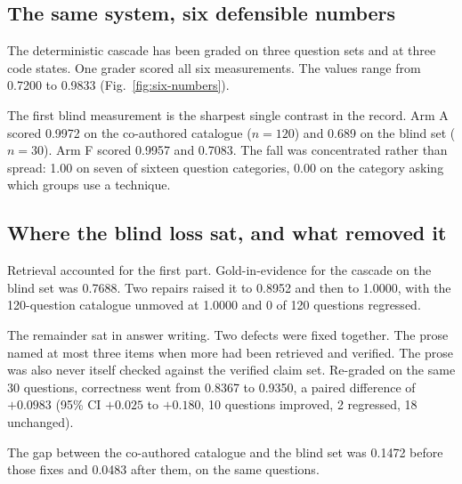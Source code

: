 \subsection{The same system, six defensible numbers}

The deterministic cascade has been graded on three question sets and at three
code states. One grader scored all six measurements. The values range from
0.7200 to 0.9833 (Fig.~\ref{fig:six-numbers}).


The first blind measurement is the sharpest single contrast in the record. Arm A
scored 0.9972 on the co-authored catalogue ($n = 120$) and 0.689 on the blind
set ($n = 30$). Arm F scored 0.9957 and 0.7083. The fall was concentrated rather
than spread: 1.00 on seven of sixteen question categories, 0.00 on the category
asking which groups use a technique.

\subsection{Where the blind loss sat, and what removed it}

Retrieval accounted for the first part. Gold-in-evidence for the cascade on the
blind set was 0.7688. Two repairs raised it to 0.8952 and then to 1.0000, with
the 120-question catalogue unmoved at 1.0000 and 0 of 120 questions regressed.

The remainder sat in answer writing. Two defects were fixed together. The prose
named at most three items when more had been retrieved and verified. The prose
was also never itself checked against the verified claim set. Re-graded on the
same 30 questions, correctness went from 0.8367 to 0.9350, a paired difference
of $+0.0983$ (95\% CI $+0.025$ to $+0.180$, 10 questions improved, 2 regressed,
18 unchanged).

The gap between the co-authored catalogue and the blind set was 0.1472 before
those fixes and 0.0483 after them, on the same questions.

